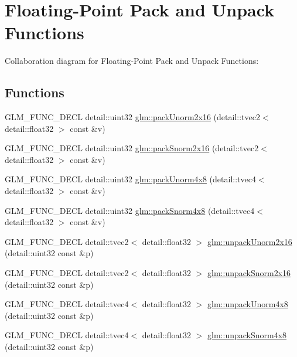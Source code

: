\hypertarget{group__core__func__packing}{}\section{Floating-\/\+Point Pack and Unpack Functions}
\label{group__core__func__packing}
Collaboration diagram for Floating-\/\+Point Pack and Unpack Functions\+:
\subsection*{Functions}
\begin{DoxyCompactItemize}
\item 
G\+L\+M\+\_\+\+F\+U\+N\+C\+\_\+\+D\+E\+C\+L detail\+::uint32 \hyperlink{group__core__func__packing_ga38cc970d20075fda38a1725f668ec1e3}{glm\+::pack\+Unorm2x16} (detail\+::tvec2$<$ detail\+::float32 $>$ const \&v)
\item 
G\+L\+M\+\_\+\+F\+U\+N\+C\+\_\+\+D\+E\+C\+L detail\+::uint32 \hyperlink{group__core__func__packing_ga25db573698cb49ea4c4ef96bfcebecf3}{glm\+::pack\+Snorm2x16} (detail\+::tvec2$<$ detail\+::float32 $>$ const \&v)
\item 
G\+L\+M\+\_\+\+F\+U\+N\+C\+\_\+\+D\+E\+C\+L detail\+::uint32 \hyperlink{group__core__func__packing_ga4b10d27c4f1f5be5936b49ccc0d661ec}{glm\+::pack\+Unorm4x8} (detail\+::tvec4$<$ detail\+::float32 $>$ const \&v)
\item 
G\+L\+M\+\_\+\+F\+U\+N\+C\+\_\+\+D\+E\+C\+L detail\+::uint32 \hyperlink{group__core__func__packing_ga642b59fa9588eee81bea2f35e1556aae}{glm\+::pack\+Snorm4x8} (detail\+::tvec4$<$ detail\+::float32 $>$ const \&v)
\item 
G\+L\+M\+\_\+\+F\+U\+N\+C\+\_\+\+D\+E\+C\+L detail\+::tvec2$<$ detail\+::float32 $>$ \hyperlink{group__core__func__packing_gaa0b6b63ebe8cd5899b277bce84237ad1}{glm\+::unpack\+Unorm2x16} (detail\+::uint32 const \&p)
\item 
G\+L\+M\+\_\+\+F\+U\+N\+C\+\_\+\+D\+E\+C\+L detail\+::tvec2$<$ detail\+::float32 $>$ \hyperlink{group__core__func__packing_gafeb2843ce77c028f30ef5acb02e7aa2c}{glm\+::unpack\+Snorm2x16} (detail\+::uint32 const \&p)
\item 
G\+L\+M\+\_\+\+F\+U\+N\+C\+\_\+\+D\+E\+C\+L detail\+::tvec4$<$ detail\+::float32 $>$ \hyperlink{group__core__func__packing_ga88febf67bc78f5ad96735b0ca9cbb073}{glm\+::unpack\+Unorm4x8} (detail\+::uint32 const \&p)
\item 
G\+L\+M\+\_\+\+F\+U\+N\+C\+\_\+\+D\+E\+C\+L detail\+::tvec4$<$ detail\+::float32 $>$ \hyperlink{group__core__func__packing_ga9a43a9dd70403585d73627ddec6a85ff}{glm\+::unpack\+Snorm4x8} (detail\+::uint32 const \&p)

\end{DoxyCompactItemize}
